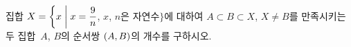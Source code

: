 집합 $X=\biggl\{x \biggm| x=\dfrac{9}{n}$, $x$, $n$은 자연수$\biggr\}$에 대하여 $A\subset B\subset X$, $X\ne B$를 만족시키는 두 집합~$A$, $B$의 순서쌍 $(A{,}\mkern3mu\mathopen{}B)$의 개수를 구하시오.
